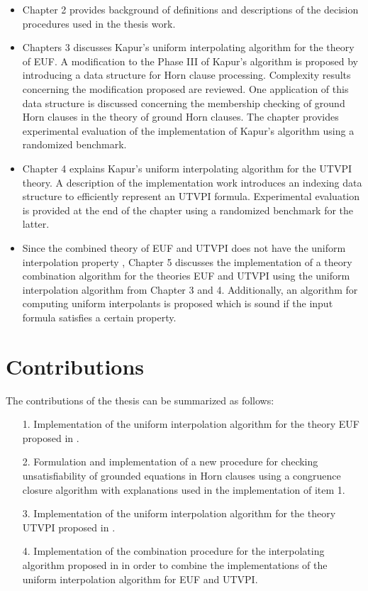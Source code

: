 \begin{itemize}
  \item Chapter 2 provides background 
    of definitions and descriptions of the
    decision procedures 
    used in the thesis work.
  \item Chapters 3 discusses Kapur's uniform 
    interpolating algorithm for the theory of EUF.
    A modification to the Phase III of 
    Kapur's algorithm is proposed by introducing a 
    data structure for Horn clause processing. 
    Complexity results concerning the modification 
    proposed are reviewed. 
    One application of this data structure
    is discussed concerning the membership 
    checking of ground 
    Horn clauses in the theory of ground Horn clauses.
    The chapter provides experimental evaluation
    of the implementation of Kapur's algorithm 
    using a randomized benchmark.
  \item Chapter 4 explains Kapur's uniform interpolating
    algorithm for the UTVPI theory. A description 
    of the implementation work introduces an indexing
    data structure to efficiently represent an UTVPI
    formula. Experimental evaluation is provided at 
    the end of the chapter using a randomized 
    benchmark for the latter. 
  \item Since the combined theory of EUF and UTVPI
    does not have the uniform interpolation property 
    \cite{10.1007/978-3-030-51074-9_11},
    Chapter 5 discusses the implementation of
    a theory combination algorithm for the theories
    EUF and UTVPI using the uniform 
    interpolation algorithm from Chapter 3 and 4. 
    Additionally, an algorithm for computing 
    uniform interpolants
    is proposed which is sound if the input 
    formula satisfies a certain property.

\end{itemize} 

\section{Contributions}

The contributions of the thesis can be summarized as follows:

\begin{itemize}
  \item[1.] Implementation of the uniform 
    interpolation algorithm for the theory EUF 
    proposed in \cite{KAPUR2017}.
  \item[2.] Formulation and implementation of a new 
    procedure for checking unsatisfiability of 
    grounded equations in 
    Horn clauses using a congruence closure 
    algorithm with explanations
    used in the implementation of item 1.
  \item[3.] Implementation of the uniform 
    interpolation algorithm for the theory UTVPI
    proposed in \cite{KAPUR2017}.
  \item[4.] Implementation of the combination 
    procedure for the interpolating
    algorithm proposed in 
    \cite{10.1007/11532231_26} in order to 
    combine the implementations of the
    uniform interpolation algorithm for EUF
    and UTVPI.
\end{itemize}

